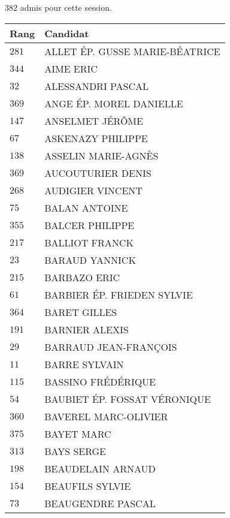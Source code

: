 




  $382$ admis pour cette session.

  \begin{xltabular}{\linewidth}{|l|X|}
    \hline
    \textbf{Rang} & \textbf{Candidat} \\
    \hline
    $281$ & ALLET ÉP. GUSSE MARIE-BÉATRICE \\
    \hline
    $344$ & AIME ERIC \\
    \hline
    $32$ & ALESSANDRI PASCAL \\
    \hline
    $369$ & ANGE ÉP. MOREL DANIELLE \\
    \hline
    $147$ & ANSELMET JÉRÔME \\
    \hline
    $67$ & ASKENAZY PHILIPPE \\
    \hline
    $138$ & ASSELIN MARIE-AGNÈS \\
    \hline
    $369$ & AUCOUTURIER DENIS \\
    \hline
    $268$ & AUDIGIER VINCENT \\
    \hline
    $75$ & BALAN ANTOINE \\
    \hline
    $355$ & BALCER PHILIPPE \\
    \hline
    $217$ & BALLIOT FRANCK \\
    \hline
    $23$ & BARAUD YANNICK \\
    \hline
    $215$ & BARBAZO ERIC \\
    \hline
    $61$ & BARBIER ÉP. FRIEDEN SYLVIE \\
    \hline
    $364$ & BARET GILLES \\
    \hline
    $191$ & BARNIER ALEXIS \\
    \hline
    $29$ & BARRAUD JEAN-FRANÇOIS \\
    \hline
    $11$ & BARRE SYLVAIN \\
    \hline
    $115$ & BASSINO FRÉDÉRIQUE \\
    \hline
    $54$ & BAUBIET ÉP. FOSSAT VÉRONIQUE \\
    \hline
    $360$ & BAVEREL MARC-OLIVIER \\
    \hline
    $375$ & BAYET MARC \\
    \hline
    $313$ & BAYS SERGE \\
    \hline
    $198$ & BEAUDELAIN ARNAUD \\
    \hline
    $154$ & BEAUFILS SYLVIE \\
    \hline
    $73$ & BEAUGENDRE PASCAL \\

\end{xltabular}
